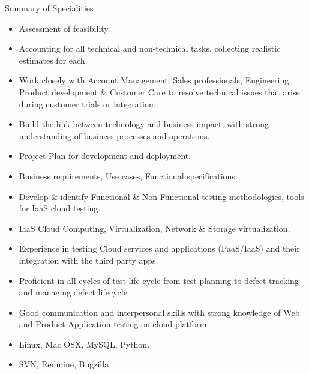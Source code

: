 \documentclass[a4paper,12pt]{article}
\begin{document}
\begin{resumesummary}{Summary of Specialities}
\begin{itemize}
  \item Assessment of feasibility.
  \item Accounting for all technical and non-technical tasks, collecting realistic estimates for each.
  \item Work closely with Account Management, Sales professionals, Engineering, Product development \& Customer Care to resolve technical issues that arise during customer trials or integration.
  \item Build the link between technology and business impact, with strong understanding of business processes and operations.
  \item Project Plan for development and deployment.
  \item Business requirements, Use cases, Functional specifications.
  \item Develop \& identify Functional \& Non-Functional testing methodologies, tools for IaaS cloud testing.
  \item IaaS Cloud Computing, Virtualization, Network \& Storage virtualization.
  \item Experience in testing Cloud services and applications (PaaS/IaaS) and their integration with the third party apps.
  \item Proficient in all cycles of test life cycle from test planning to defect tracking and managing defect lifecycle.
  \item Good communication and interpersonal skills with strong knowledge of Web and Product Application testing on cloud platform.
  \item Linux, Mac OSX, MySQL, Python.
  \item SVN, Redmine, Bugzilla.
\newline
\end{itemize}
\end{resumesummary}

\newpage
\end{document}
